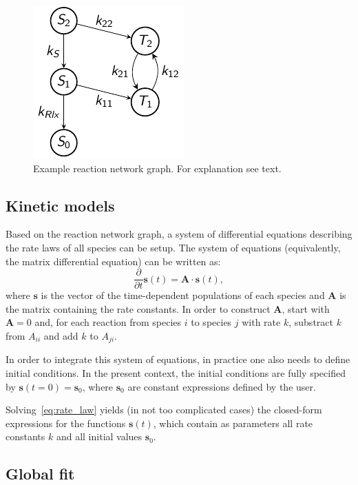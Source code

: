 \documentclass[a4paper,10pt,DIV=15,openany]{scrbook}
\newcommand{\VEC}[1]{\ensuremath{\mathbf{#1}}}
\begin{document}
\begin{figure}[htb]
  \centering
  \includegraphics[scale=1]{img/reaction_networks/example_graph.pdf}
  \caption{Example reaction network graph. For explanation see text.}
  \label{fig:example_graph}
\end{figure}

\subsection{Kinetic models}

Based on the reaction network graph, a system of differential equations describing the rate laws of all species can be setup.
The system of equations (equivalently, the matrix differential equation) can be written as:
\begin{equation}
  \frac{\partial}{\partial t} \VEC{s}(t) = \VEC{A} \cdot \VEC{s}(t),
  \label{eq:rate_law}
\end{equation}
where $\VEC{s}$ is the vector of the time-dependent populations of each species and $\VEC{A}$ is the matrix containing the rate constants.
In order to construct $\VEC{A}$, start with $\VEC{A}=0$ and, for each reaction from species $i$ to species $j$ with rate $k$, substract $k$ from $A_{ii}$ and add $k$ to $A_{ji}$.

In order to integrate this system of equations, in practice one also needs to define initial conditions. 
In the present context, the initial conditions are fully specified by $\VEC{s}(t=0)=\VEC{s}_0$, where $\VEC{s}_0$ are constant expressions defined by the user.

Solving~\eqref{eq:rate_law} yields (in not too complicated cases) the closed-form expressions for the functions $\VEC{s}(t)$, which contain as parameters all rate constants $k$ and all initial values $\VEC{s}_0$.

\subsection{Global fit}
\end{document}
